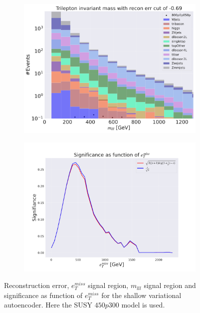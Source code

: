 \begin{figure}[H]
    \hfill
    \begin{subfigure}{.40\textwidth}
        \includegraphics[width=\textwidth]{Figures/VAE_testing/small/3lep/b_data_recon_big_rm3_feats_sig_800p0p050p_mlll_recon_errcut_-0.69.pdf}
        \caption{}
        \label{fig:VAE_3lep_small_mlll_800_2}
    \end{subfigure}
    \hfill   
    \begin{subfigure}{.40\textwidth}
        \includegraphics[width=\textwidth]{Figures/VAE_testing/small/3lep/significance_etmiss_800p0p050p_-0.6856921439167579.pdf}
        \caption{}
        \label{fig:VAE_3lep_small_signi_800_2}
    \end{subfigure}
    \hfill      
    \caption[3lep shallow network | $800p50$ | VAE | 2]{Reconstruction error, $e_T^{miss}$ signal region, $m_{lll}$ signal region and significance as function of 
    $e_T^{miss}$ for the shallow variational autoencoder. Here the SUSY $450p300$ model is used.}
    \label{fig:VAE_3lep_small_rec_sig_signi_800_2}
\end{figure}












